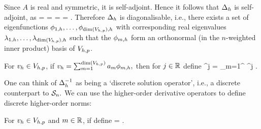 Since $A$ is real and symmetric, it is self-adjoint. Hence it follows that $\Delta_{h}$ is self-adjoint, as
\beqs
\IPLtDn{\Deltah \wh}{\vh} =  =  = \overline{\IPLtDn{\Deltah \vh}{\wh}} = \IPLtDn{\wh}{\Deltah \vh}.
\eeqs
Therefore $\Delta_{h}$ is diagonalisable, i.e., there exists a set of eigenfunctions $\phioh,\ldots,\phidimVhph$  with corresponding real eigenvalues $\lambdaoh, \ldots, \lambdadimVhph$ such that the $\phi_{m,h}$ form an orthonormal (in the $n$-weighted inner product) basis of $V_{h,p}$.

For $v_{h} \in V_{h,p}$, if $\vh = \sum_{m=1}^{\dimVhp} \am \phimh,$ then for $j \in \mathbb R$ define
\beqs
\Deltah^j \vh = \sum_{m=1}^{\dimVhp} \lambdamh^j \am \phimh.
\eeqs


\ede
One can think of $\Delta_{h}^{-1}$ as being a `discrete solution operator', i.e., a discrete counterpart to $\mathcal S_{n}.$
We can use the higher-order derivative operators to define discrete higher-order norms:

For $v_{h} \in V_{h,p}$ and $m \in \mathbb R$, if define
\beqs
\Nshn{\vh} = .
\eeqs
\ede



